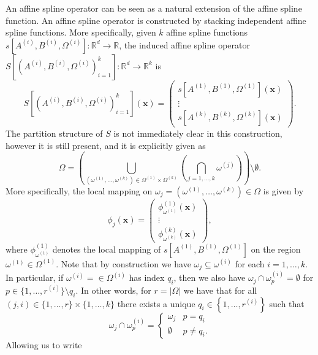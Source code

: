 An affine spline operator can be seen as a natural extension of the affine spline function. An affine spline operator is constructed by stacking independent affine spline functions. More specifically, given $k$ affine spline functions $s\left[A^{(i)},B^{(i)},\Omega^{(i)}\right]:\mathbb{R}^d\to\mathbb{R}$, the induced affine spline operator $S\left[\left(A^{(i)},B^{(i)},\Omega^{(i)}\right)_{i=1}^k\right]:\mathbb{R}^d\to\mathbb{R}^k$ is $$S\left[\left(A^{(i)},B^{(i)},\Omega^{(i)}\right)_{i=1}^k\right](\mathbf{x})=\begin{pmatrix}s\left[A^{(1)},B^{(1)},\Omega^{(1)}\right](\mathbf{x})\\\vdots\\s\left[A^{(k)},B^{(k)},\Omega^{(k)}\right](\mathbf{x})\end{pmatrix}.$$The partition structure of $S$ is not immediately clear in this construction, however it is still present, and it is explicitly given as $$\Omega=\left(\bigcup_{\left(\omega^{(1)},\dots,\omega^{(k)}\right)\in\Omega^{(1)}\times\Omega^{(k)}}\left(\bigcap_{j=1,\dots,k}\omega^{(j)}\right)\right)\setminus\emptyset.$$More specifically, the local mapping on $\omega_j=\left(\omega^{(1)},\dots,\omega^{(k)}\right)\in\Omega$ is given by $$\phi_j(\mathbf{x})=\begin{pmatrix}\phi^{(1)}_{\omega^{(1)}}(\mathbf{x})\\\vdots\\\phi^{(k)}_{\omega^{(k)}}(\mathbf{x})\end{pmatrix},$$where $\phi^{(1)}_{\omega^{(1)}}$ denotes the local mapping of $s\left[A^{(1)},B^{(1)},\Omega^{(1)}\right]$ on the region $\omega^{(1)}\in\Omega^{(1)}$. Note that by construction we have $\omega_j\subseteq\omega^{(i)}$ for each $i=1,\dots,k$. In particular, if $\omega^{(i)}=\in\Omega^{(i)}$ has index $q_i$, then we also have $\omega_j\cap\omega_p^{(i)}=\emptyset$ for $p\in\{1,\dots,r^{(i)}\}\setminus q_i$. In other words, for $r=\vert\Omega\vert$ we have that for all $(j,i)\in\{1,\dots,r\}\times\{1,\dots,k\}$ there exists a unique $q_i\in\left\{1,\dots,r^{(i)}\right\}$ such that $$\omega_j\cap\omega^{(i)}_p=\begin{cases}\omega_j&p=q_i\\\emptyset&p\neq q_i.\end{cases}$$Allowing us to write 
